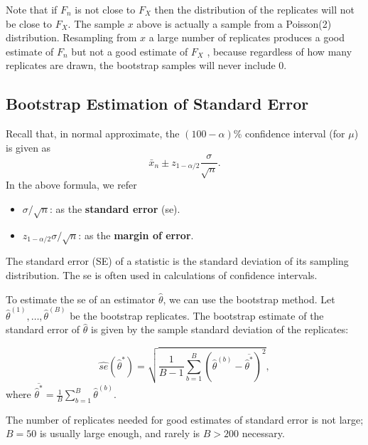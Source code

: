 \documentclass[
  letterpaper,
  DIV=11,
  numbers=noendperiod]{scrreprt}
\providecommand{\tightlist}{%
  \setlength{\itemsep}{0pt}\setlength{\parskip}{0pt}}
\begin{document}
Note that if \(F_n\) is not close to \(F_X\) then the distribution of
the replicates will not be close to \(F_X\). The sample \(x\) above is
actually a sample from a Poisson(2) distribution. Resampling from \(x\)
a large number of replicates produces a good estimate of \(F_n\) but not
a good estimate of \(F_X\) , because regardless of how many replicates
are drawn, the bootstrap samples will never include \(0\).

\subsection{Bootstrap Estimation of Standard
Error}\label{bootstrap-estimation-of-standard-error}

Recall that, in normal approximate, the \((100-\alpha)\)\% confidence
interval (for \(\mu\)) is given as \[
  \bar{x}_n \pm z_{1-\alpha/2} \frac{\sigma}{\sqrt{n}}.
\] In the above formula, we refer

\begin{itemize}
\tightlist
\item
  \(\sigma/\sqrt{n}\): as the \textbf{standard error} (se).
\item
  \(z_{1-\alpha/2}  \sigma/\sqrt{n}\): as the \textbf{margin of error}.
\end{itemize}

The standard error (SE) of a statistic is the standard deviation of its
sampling distribution. The se is often used in calculations of
confidence intervals.

To estimate the se of an estimator \(\hat \theta\), we can use the
bootstrap method. Let \(\hat \theta^{(1)},\dots,\hat \theta^{(B)}\) be
the bootstrap replicates. The bootstrap estimate of the standard error
of \(\hat \theta\) is given by the sample standard deviation of the
replicates:

\[
\widehat{s e}\left(\hat{\theta}^*\right)=\sqrt{\frac{1}{B-1} \sum_{b=1}^B\left(\hat{\theta}^{(b)}-\overline{\hat{\theta}^*}\right)^2},
\] where
\(\overline{\hat{\theta}^*}=\frac{1}{B} \sum_{b=1}^B \hat{\theta}^{(b)}\).

\begin{tcolorbox}[enhanced jigsaw, bottomtitle=1mm, rightrule=.15mm, colframe=quarto-callout-note-color-frame, coltitle=black, opacitybacktitle=0.6, breakable, colbacktitle=quarto-callout-note-color!10!white, leftrule=.75mm, toptitle=1mm, titlerule=0mm, toprule=.15mm, opacityback=0, title=\textcolor{quarto-callout-note-color}{\faInfo}\hspace{0.5em}{Remark for estimating se}, colback=white, arc=.35mm, bottomrule=.15mm, left=2mm]

The number of replicates needed for good estimates of standard error is
not large; \(B = 50\) is usually large enough, and rarely is \(B > 200\)
necessary.

\end{tcolorbox}
\end{document}
